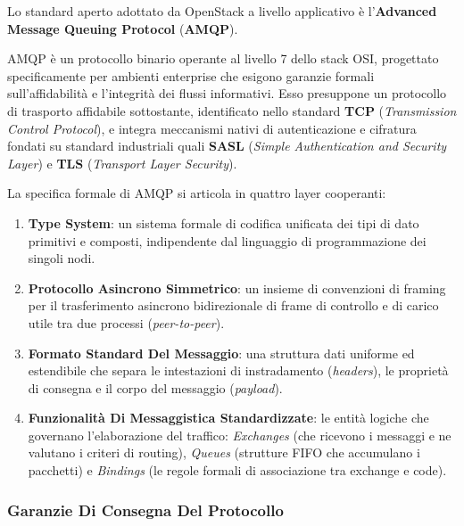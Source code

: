 \documentclass[11pt, a4paper]{article}
\begin{document}
Lo standard aperto adottato da OpenStack a livello applicativo è l'\textbf{Advanced Message Queuing Protocol} (\textbf{AMQP}).

AMQP è un protocollo binario operante al livello 7 dello stack OSI, progettato specificamente per ambienti enterprise che esigono garanzie formali sull'affidabilità e l'integrità dei flussi informativi. Esso presuppone un protocollo di trasporto affidabile sottostante, identificato nello standard \textbf{TCP} (\emph{Transmission Control Protocol}), e integra meccanismi nativi di autenticazione e cifratura fondati su standard industriali quali \textbf{SASL} (\emph{Simple Authentication and Security Layer}) e \textbf{TLS} (\emph{Transport Layer Security}).

La specifica formale di AMQP si articola in quattro layer cooperanti:
\begin{enumerate}
    \item \textbf{Type System}: un sistema formale di codifica unificata dei tipi di dato primitivi e composti, indipendente dal linguaggio di programmazione dei singoli nodi.
    \item \textbf{Protocollo Asincrono Simmetrico}: un insieme di convenzioni di framing per il trasferimento asincrono bidirezionale di frame di controllo e di carico utile tra due processi (\emph{peer-to-peer}).
    \item \textbf{Formato Standard Del Messaggio}: una struttura dati uniforme ed estendibile che separa le intestazioni di instradamento (\emph{headers}), le proprietà di consegna e il corpo del messaggio (\emph{payload}).
    \item \textbf{Funzionalità Di Messaggistica Standardizzate}: le entità logiche che governano l'elaborazione del traffico: \emph{Exchanges} (che ricevono i messaggi e ne valutano i criteri di routing), \emph{Queues} (strutture FIFO che accumulano i pacchetti) e \emph{Bindings} (le regole formali di associazione tra exchange e code).
\end{enumerate}

\subsubsection{Garanzie Di Consegna Del Protocollo}
\end{document}
